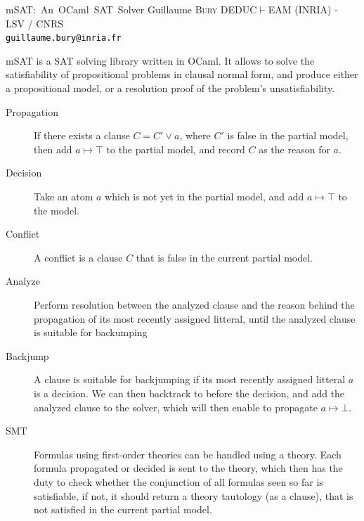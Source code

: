 \documentclass[portrait,a0,final]{a0poster}
\def\msat{\textsf{mSAT}}
\begin{document}
\sffamily %

\postertitle
{\msat{}:~An~OCaml~SAT~Solver}
{Guillaume \textsc{Bury}}
{DEDUC$\vdash$EAM (INRIA) - LSV / CNRS\\
\Large \textcolor{black}{\texttt{guillaume.bury@inria.fr}}}

\begin{center}

\begin{multicols}{2}

{
  \vspace{0.5cm} %

  \msat{} is a SAT solving library written in OCaml. It allows to solve the satisfiability
  of propositional problems in clausal normal form, and produce either a propositional model,
  or a resolution proof of the problem's unsatisfiability.
}

{
  \begin{description}
    \item[Propagation] If there exists a clause $C = C' \lor a$, where
      $C'$ is false in the partial model, then add $a \mapsto \top$ to
      the partial model, and record $C$ as the reason for $a$.
    \item[Decision] Take an atom $a$ which is not yet in the partial model,
      and add $a \mapsto \top$ to the model.
    \item[Conflict] A conflict is a clause $C$ that is false in the current partial
      model.
    \item[Analyze] Perform resolution between the analyzed clause and the reason
      behind the propagation of its most recently assigned litteral, until
      the analyzed clause is suitable for backumping
    \item[Backjump] A clause is suitable for backjumping if its most recently
      assigned litteral $a$ is a decision. We can then backtrack to before the
      decision, and add the analyzed clause to the solver, which will then enable
      to propagate $a \mapsto \bot$.
    \item[SMT] Formulas using first-order theories can be handled using a theory.
      Each formula propagated or decided is sent to the theory, which then
      has the duty to check whether the conjunction of all formulas seen so
      far is satisfiable, if not, it should return a theory tautology (as a clause),
      that is not satisfied in the current partial model.
  \end{description}
}


\end{multicols}
\end{center}
\end{document}
